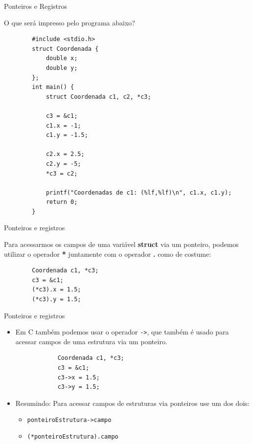 \documentclass[handout]{beamer}
\newcommand{\cod}[1]{\texttt{#1}}
\begin{document}
\begin{frame}[fragile]{Ponteiros e Registros}

    O que será impresso pelo programa abaixo?
    \vspace{-1em}
    \begin{verbatim}
        #include <stdio.h>
        struct Coordenada {
            double x;
            double y;
        };
        int main() {
            struct Coordenada c1, c2, *c3;

            c3 = &c1;
            c1.x = -1;
            c1.y = -1.5;

            c2.x = 2.5;
            c2.y = -5;
            *c3 = c2;

            printf("Coordenadas de c1: (%lf,%lf)\n", c1.x, c1.y);
            return 0;
        }
    \end{verbatim}

\end{frame}

\begin{frame}[fragile]{Ponteiros e registros}

    Para acessarmos os campos de uma variável \textbf{struct} via um ponteiro,
    podemos utilizar o operador \textbf{*} juntamente com o operador \textbf{.}
    como de costume:

    \begin{verbatim}
        Coordenada c1, *c3;
        c3 = &c1;
        (*c3).x = 1.5;
        (*c3).y = 1.5;
    \end{verbatim}

\end{frame}

\begin{frame}[fragile]{Ponteiros e registros}

    \begin{itemize}
        \item Em C também podemos usar o operador \cod{->}, que
        também é usado para acessar campos de uma estrutura via um
        ponteiro.

        \begin{verbatim}
            Coordenada c1, *c3;
            c3 = &c1;
            c3->x = 1.5;
            c3->y = 1.5;
        \end{verbatim}

        \item Resumindo: Para acessar campos de estruturas via
        ponteiros use um dos dois:
        \begin{itemize}
            \item \cod{ponteiroEstrutura->campo}
            \item \cod{(*ponteiroEstrutura).campo}
        \end{itemize}
    \end{itemize}

\end{frame}
\end{document}
